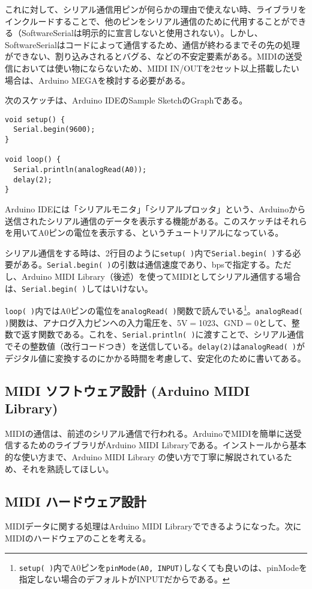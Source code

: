 \documentclass[uplatex, 10pt, dvipdfmx]{jsarticle}
\numberwithin{equation}{section}
\newcommand{\emphj}[1]{\textbf{\textrm{\textgt{{#1}}}}}
\begin{document}
これに対して、シリアル通信用ピンが何らかの理由で使えない時、\emphj{SoftwareSerial}ライブラリをインクルードすることで、他のピンをシリアル通信のために代用することができる（SoftwareSerialは明示的に宣言しないと使用されない）。しかし、SoftwareSerialはコードによって通信するため、通信が終わるまでその先の処理ができない、割り込みされるとバグる、などの不安定要素がある。MIDIの送受信においては使い物にならないため、MIDI IN/OUTを2セット以上搭載したい場合は、Arduino MEGAを検討する必要がある。

次のスケッチは、Arduino IDEのSample SketchのGraphである。

\begin{lstlisting}[caption=Graph]
void setup() {
  Serial.begin(9600);
}

void loop() {
  Serial.println(analogRead(A0));
  delay(2);
}
\end{lstlisting}

Arduino IDEには「シリアルモニタ」「シリアルプロッタ」という、Arduinoから送信されたシリアル通信のデータを表示する機能がある。このスケッチはそれらを用いてA0ピンの電位を表示する、というチュートリアルになっている。

シリアル通信をする時は、2行目のように\verb|setup( )|内で\verb|Serial.begin( )|する必要がある。\verb|Serial.begin( )|の引数は通信速度であり、bpsで指定する。ただし、Arduino MIDI Library（後述）を使ってMIDIとしてシリアル通信する場合は、\verb|Serial.begin( )|してはいけない。

\verb|loop( )|内ではA0ピンの電位を\verb|analogRead( )|関数で読んでいる\footnote{\verb|setup( )|内でA0ピンを\verb|pinMode(A0, INPUT)|しなくても良いのは、pinModeを指定しない場合のデフォルトがINPUTだからである。}。\verb|analogRead( )|関数は、アナログ入力ピンへの入力電圧を、5V$=$1023、GND$=$0として、整数で返す関数である。これを、\verb|Serial.println( )|に渡すことで、シリアル通信でその整数値（改行コードつき）を送信している。\verb|delay(2)|は\verb|analogRead( )|がデジタル値に変換するのにかかる時間を考慮して、安定化のために書いてある。

\subsection{MIDI ソフトウェア設計 (Arduino MIDI Library)}
MIDIの通信は、前述のシリアル通信で行われる。ArduinoでMIDIを簡単に送受信するためのライブラリがArduino MIDI Libraryである。インストールから基本的な使い方まで、Arduino MIDI Library の使い方\cite{ArduinoMIDILib}で丁寧に解説されているため、それを熟読してほしい。

\subsection{MIDI ハードウェア設計}
MIDIデータに関する処理はArduino MIDI Libraryでできるようになった。次にMIDIのハードウェアのことを考える。
\end{document}
